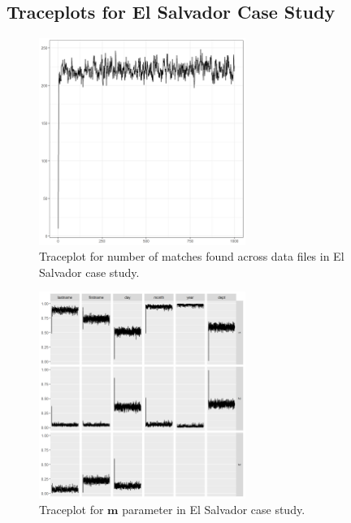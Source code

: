 \documentclass[ba]{imsart}
\begin{document}
\clearpage
	
	\hypertarget{appendix-es}{%
		\subsection{Traceplots for El Salvador Case Study}\label{app:appendix-es}}
	
	\begin{figure}[!h]
		\begin{center}
			\includegraphics[width=0.6\textwidth]{../notes/figures/el_salvador/overlap_trace} 
			\caption{Traceplot for number of matches found across data files in El Salvador case study.} \label{fig:overlap_trace}
		\end{center}
	\end{figure}
	
	\begin{figure}[!h]
		\begin{center}
			\includegraphics[width=0.6\textwidth]{../notes/figures/el_salvador/m_trace} 
			\caption{Traceplot for $\bm{m}$ parameter in El Salvador case study.} \label{fig:m_trace}
		\end{center}
	\end{figure}
	
\end{document}
